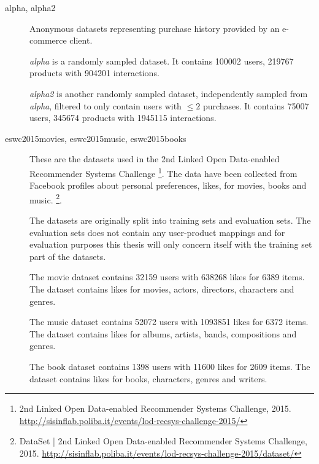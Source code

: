 \begin{description}
    \item[alpha, alpha2] \hfill

        Anonymous datasets representing purchase history provided by an e-commerce client.

        \textit{alpha} is a randomly sampled dataset. It contains 100002 users, 219767 products with 904201 interactions.

        \textit{alpha2} is another randomly sampled dataset, independently sampled from \textit{alpha}, filtered to only contain users with $\leq 2$ purchases. It contains 75007 users, 345674 products with 1945115 interactions.




    \item[eswc2015movies, eswc2015music, eswc2015books] \hfill

        These are the datasets used in the 2nd Linked Open Data-enabled Recommender Systems Challenge
        \footnote{2nd Linked Open Data-enabled Recommender Systems Challenge, 2015. \url{http://sisinflab.poliba.it/events/lod-recsys-challenge-2015/}}.
        The data have been collected from Facebook profiles about personal preferences, likes, for movies, books and music.
        \footnote{DataSet | 2nd Linked Open Data-enabled Recommender Systems Challenge, 2015. \url{http://sisinflab.poliba.it/events/lod-recsys-challenge-2015/dataset/}}.

        The datasets are originally split into training sets and evaluation sets. The evaluation sets does not contain any user-product mappings and for evaluation purposes this thesis will only concern itself with the training set part of the datasets.

        The movie dataset contains 32159 users with 638268 likes for 6389 items. The dataset contains likes for movies, actors, directors, characters and genres.

        The music dataset contains 52072 users with 1093851 likes for 6372 items. The dataset contains likes for albums, artists, bands, compositions and genres.

        The book dataset contains 1398 users with 11600 likes for 2609 items. The dataset contains likes for books, characters, genres and writers.


\end{description}
